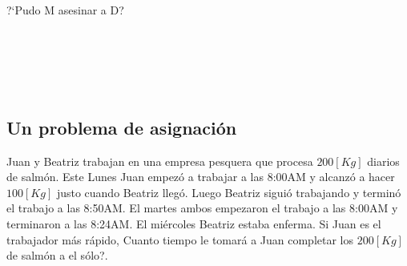 \documentclass[letter,11pt]{article}
\newcommand\0{\mathbf{0}}
\begin{document}
\begin{enumerate}
					\medskip
							
					\begin{Verbatim}[gobble=6,frame=single]
					
					
					
					
					\end{Verbatim}
					
					\medskip
				
					\noindent ?`Pudo M asesinar a D?
				
					\medskip
							
					\begin{Verbatim}[gobble=6,frame=single]
					
					
					
					
					\end{Verbatim}
					
					\medskip

\subsection{Un problema de asignaci\'on}

Juan y Beatriz trabajan en una empresa pesquera que procesa $200[Kg]$ diarios de salm\'on. Este Lunes Juan empez\'o a trabajar a las 8:00AM y alcanz\'o a hacer $100[Kg]$ justo cuando Beatriz lleg\'o. Luego Beatriz sigui\'o trabajando y termin\'o el trabajo a las 8:50AM. El martes ambos empezaron el trabajo a las 8:00AM y terminaron a las 8:24AM. El mi\'ercoles Beatriz estaba enferma. Si Juan es el trabajador m\'as r\'apido, \textquestiondown Cuanto tiempo le tomar\'a a Juan completar los $200[Kg]$ de salm\'on a el s\'olo?.


\end{enumerate}
\end{document}
